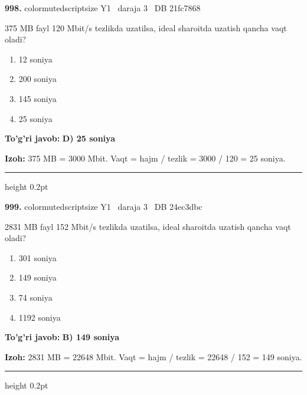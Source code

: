 \documentclass[10pt,a4paper,oneside]{article}
\begin{document}
\noindent\textbf{\color{ink}998.}  {color{muted}scriptsize Y1 \textbullet\ daraja 3 \textbullet\ DB 21fc7868}
\par
375 MB fayl 120 Mbit/s tezlikda uzatilsa, ideal sharoitda uzatish qancha vaqt oladi?
\begin{enumerate}[label=\Alph*),leftmargin=9mm]
\item 12 soniya
\item 200 soniya
\item 145 soniya
\item 25 soniya
\end{enumerate}
\begin{tcolorbox}[enhanced,breakable,colback=teal!4,colframe=teal!50!black,boxrule=0.5pt,arc=1.1mm,left=3mm,right=3mm,top=1.7mm,bottom=1.7mm,before skip=2mm,after skip=2mm]
\textbf{\color{teal}To'g'ri javob:} \textbf{D) 25 soniya}
\par\smallskip
\textbf{Izoh:} 375 MB = 3000 Mbit. Vaqt = hajm / tezlik = 3000 / 120 = 25 soniya.
\end{tcolorbox}
\vspace{2mm}\hrule height 0.2pt \vspace{3mm}

\noindent\textbf{\color{ink}999.}  {color{muted}scriptsize Y1 \textbullet\ daraja 3 \textbullet\ DB 24ec3dbc}
\par
2831 MB fayl 152 Mbit/s tezlikda uzatilsa, ideal sharoitda uzatish qancha vaqt oladi?
\begin{enumerate}[label=\Alph*),leftmargin=9mm]
\item 301 soniya
\item 149 soniya
\item 74 soniya
\item 1192 soniya
\end{enumerate}
\begin{tcolorbox}[enhanced,breakable,colback=teal!4,colframe=teal!50!black,boxrule=0.5pt,arc=1.1mm,left=3mm,right=3mm,top=1.7mm,bottom=1.7mm,before skip=2mm,after skip=2mm]
\textbf{\color{teal}To'g'ri javob:} \textbf{B) 149 soniya}
\par\smallskip
\textbf{Izoh:} 2831 MB = 22648 Mbit. Vaqt = hajm / tezlik = 22648 / 152 = 149 soniya.
\end{tcolorbox}
\vspace{2mm}\hrule height 0.2pt \vspace{3mm}
\end{document}
